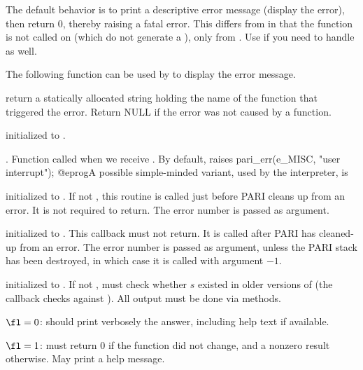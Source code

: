 The default behavior is to print a descriptive error
message (display the error), then return 0, thereby raising a fatal error.
This differs from  in that the
function is not called on  (which do not generate a ),
only from . Use  if you need to handle
 as well.

The following function can be used by  to display
the error message.

 return a statically allocated string
holding the name of the function that triggered the error. Return NULL if the
error was not caused by a function.

initialized to .

.
Function called when we receive . By default, raises
\bprog
  pari_err(e_MISC, "user interrupt");
@eprog\noindent A possible simple-minded variant, used by the
 interpreter, is


initialized to . If not , this routine is called just
before PARI cleans up from an error. It is not required to return.  The error
number is passed as argument.

initialized to . This callback must not return.
It is called after PARI has cleaned-up from an error. The error number is
passed as argument, unless the PARI stack has been destroyed, in which case
it is called with argument $-1$.

 initialized to . If not , must check whether $s$
existed in older versions of  (the  callback checks against
). All output must be done via  methods.

\item $\fl = 0$: should print verbosely the answer, including help text if
available.

\item $\fl = 1$: must return $0$ if the function did not change, and a
nonzero result otherwise. May print a help message.

